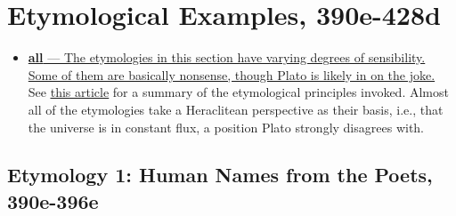 \documentclass[12pt]{article}
\begin{document}
\section{Etymological Examples, 390e-428d}

\begin{itemize}

\item \ul{\textbf{all} --- The etymologies in this section have varying degrees of sensibility. Some of them are basically nonsense, though Plato is likely in on the joke.} See \href{https://plato.stanford.edu/entries/plato-cratylus/#Ety}{\ul{this article}} for a summary of the etymological principles invoked. Almost all of the etymologies take a Heraclitean perspective as their basis, i.e., that the universe is in constant flux, a position Plato strongly disagrees with.

\end{itemize}

\subsection{Etymology 1: Human Names from the Poets, 390e-396e}
\end{document}
